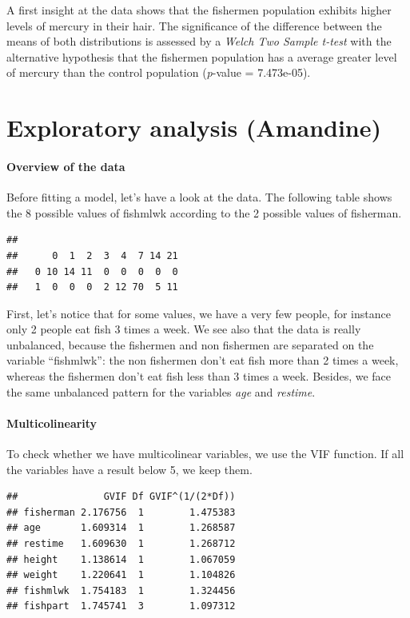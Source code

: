 \documentclass[12pt,]{article}
\let\oldparagraph\paragraph
\renewcommand{\paragraph}[1]{\oldparagraph{#1}\mbox{}}
\begin{document}
A first insight at the data shows that the fishermen population exhibits
higher levels of mercury in their hair. The significance of the
difference between the means of both distributions is assessed by a
\emph{Welch Two Sample t-test} with the alternative hypothesis that the
fishermen population has a average greater level of mercury than the
control population (\emph{p}-value = 7.473e-05).

\section{Exploratory analysis
(Amandine)}\label{exploratory-analysis-amandine}

\paragraph{Overview of the data}\label{overview-of-the-data}

Before fitting a model, let's have a look at the data. The following
table shows the 8 possible values of fishmlwk according to the 2
possible values of fisherman.

\begin{verbatim}
##    
##      0  1  2  3  4  7 14 21
##   0 10 14 11  0  0  0  0  0
##   1  0  0  0  2 12 70  5 11
\end{verbatim}

First, let's notice that for some values, we have a very few people, for
instance only 2 people eat fish 3 times a week. We see also that the
data is really unbalanced, because the fishermen and non fishermen are
separated on the variable ``fishmlwk'': the non fishermen don't eat fish
more than 2 times a week, whereas the fishermen don't eat fish less than
3 times a week. Besides, we face the same unbalanced pattern for the
variables \emph{age} and \emph{restime}.

\paragraph{Multicolinearity}\label{multicolinearity}

To check whether we have multicolinear variables, we use the VIF
function. If all the variables have a result below 5, we keep them.

\begin{verbatim}
##               GVIF Df GVIF^(1/(2*Df))
## fisherman 2.176756  1        1.475383
## age       1.609314  1        1.268587
## restime   1.609630  1        1.268712
## height    1.138614  1        1.067059
## weight    1.220641  1        1.104826
## fishmlwk  1.754183  1        1.324456
## fishpart  1.745741  3        1.097312
\end{verbatim}
\end{document}
